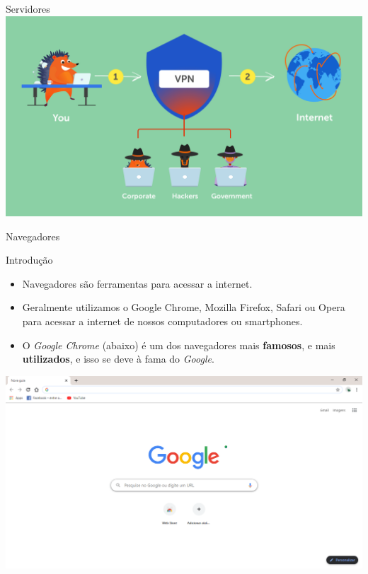 \begin{frame}{Servidores}
	\centering
	\includegraphics[width=1\linewidth]{Figuras/Ch03/fig10}
\end{frame}


\begin{frame}{Navegadores}
	\begin{block}{Introdução}
		\begin{itemize}
			\item Navegadores são ferramentas para acessar a internet.
			\item Geralmente utilizamos o Google Chrome, Mozilla Firefox, Safari ou Opera para acessar a internet de nossos computadores ou smartphones.
			\item O \textit{Google Chrome} (abaixo) é um dos navegadores mais \textbf{famosos}, e mais \textbf{utilizados}, e isso se deve à fama do \textit{Google}.
		\end{itemize}
	\end{block}

	\centering
	\includegraphics[width=0.7\linewidth]{Figuras/Ch03/fig8.2}
\end{frame}


